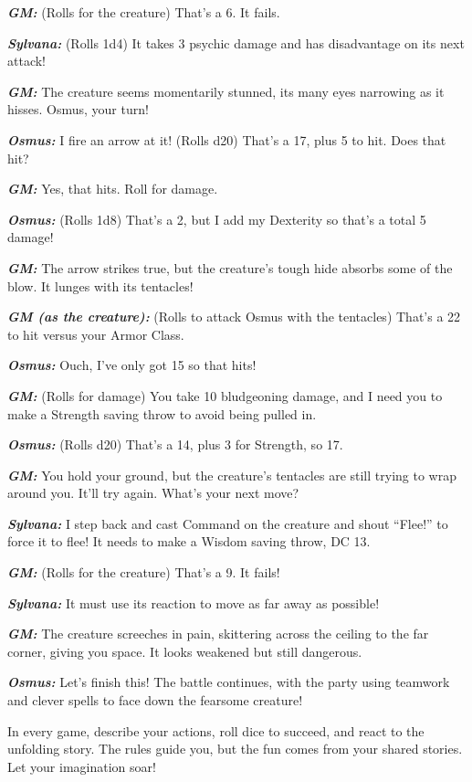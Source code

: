\textbf{\emph{GM:}} (Rolls for the creature) That's a 6. It fails.

\textbf{\emph{Sylvana:}} (Rolls 1d4) It takes 3 psychic damage and has
disadvantage on its next attack!

\textbf{\emph{GM:}} The creature seems momentarily stunned, its many
eyes narrowing as it hisses. Osmus, your turn!

\textbf{\emph{Osmus:}} I fire an arrow at it! (Rolls d20) That's a 17,
plus 5 to hit. Does that hit?

\textbf{\emph{GM:}} Yes, that hits. Roll for damage.

\textbf{\emph{Osmus:}} (Rolls 1d8) That's a 2, but I add my Dexterity so
that's a total 5 damage!

\textbf{\emph{GM:}} The arrow strikes true, but the creature's tough
hide absorbs some of the blow. It lunges with its tentacles!

\textbf{\emph{GM (as the creature):}} (Rolls to attack Osmus with the
tentacles) That's a 22 to hit versus your Armor Class.

\textbf{\emph{Osmus:}} Ouch, I've only got 15 so that hits!

\textbf{\emph{GM:}} (Rolls for damage) You take 10 bludgeoning damage,
and I need you to make a Strength saving throw to avoid being pulled in.

\textbf{\emph{Osmus:}} (Rolls d20) That's a 14, plus 3 for Strength, so
17.

\textbf{\emph{GM:}} You hold your ground, but the creature's tentacles
are still trying to wrap around you. It'll try again. What's your next
move?

\textbf{\emph{Sylvana:}} I step back and cast Command on the creature
and shout ``Flee!'' to force it to flee! It needs to make a Wisdom
saving throw, DC 13.

\textbf{\emph{GM:}} (Rolls for the creature) That's a 9. It fails!

\textbf{\emph{Sylvana:}} It must use its reaction to move as far away as
possible!

\textbf{\emph{GM:}} The creature screeches in pain, skittering across
the ceiling to the far corner, giving you space. It looks weakened but
still dangerous.

\textbf{\emph{Osmus:}} Let's finish this! The battle continues, with the
party using teamwork and clever spells to face down the fearsome
creature!

In every game, describe your actions, roll dice to succeed, and react to
the unfolding story. The rules guide you, but the fun comes from your
shared stories. Let your imagination soar!

